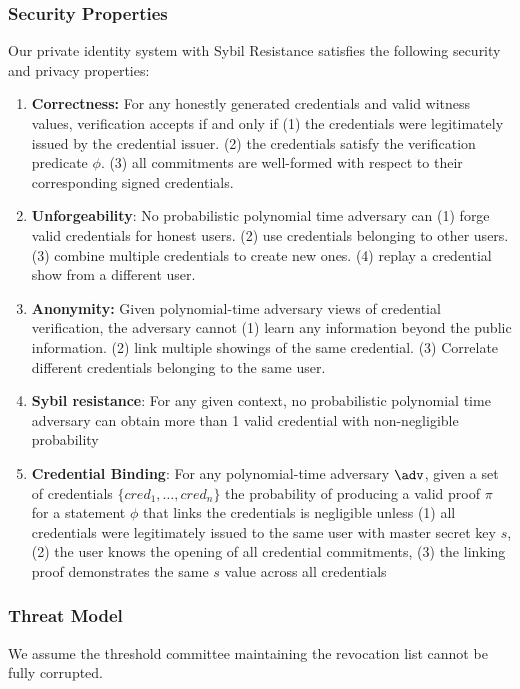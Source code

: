 \subsubsection{Security Properties}
Our private identity system with Sybil Resistance satisfies the following security and privacy properties:
\begin{enumerate}
    \item \textbf{Correctness: } For any honestly generated credentials and valid witness values, verification accepts if and only if (1) the credentials were legitimately issued by the credential issuer. (2) the credentials satisfy the verification predicate $\phi$. (3) all commitments are well-formed with respect to their corresponding signed credentials. 
    
    \item \textbf{Unforgeability}: No probabilistic polynomial time adversary can (1) forge valid credentials for honest users. (2) use credentials belonging to other users. (3) combine multiple credentials to create new ones. (4) replay a credential show from a different user. 
    
    \item \textbf{Anonymity:} Given polynomial-time adversary views of credential verification, the adversary cannot (1) learn any information beyond the public information. (2) link multiple showings of the same credential. (3) Correlate different credentials belonging to the same user.
    
    \item \textbf{Sybil resistance}: For any given context, no probabilistic polynomial time adversary can obtain more than 1 valid credential with non-negligible probability 

    \item \textbf{Credential Binding}: For any polynomial-time adversary $\adv$, given a set of credentials $\{cred_1, \dots, cred_n\}$ the probability of producing a valid proof $\pi$ for a statement $\phi$ that links the credentials is negligible unless (1) all credentials were legitimately issued to the same user with master secret key $s$, (2) the user knows the opening of all credential commitments, (3) the linking proof demonstrates the same $s$ value across all credentials

\end{enumerate}

\subsubsection{Threat Model}
We assume the threshold committee maintaining the revocation list cannot be fully corrupted.



